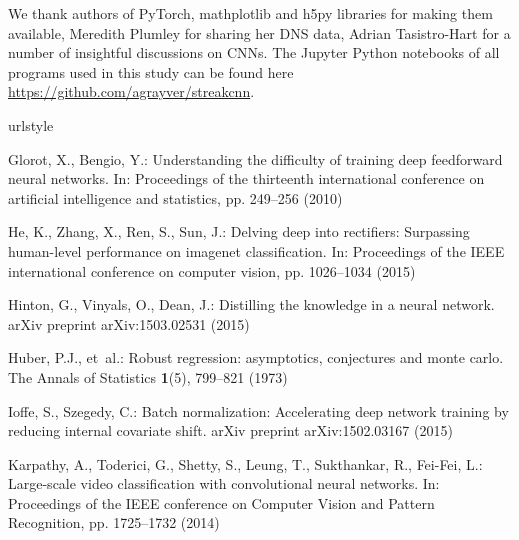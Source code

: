 \documentclass{svjour3}                     %
\begin{document}
\begin{acknowledgements}
We thank authors of PyTorch, mathplotlib and h5py libraries for making them available, Meredith Plumley for sharing her DNS data, Adrian Tasistro-Hart for a number of insightful discussions on CNNs. The Jupyter Python notebooks of all programs used in this study can be found here \url{https://github.com/agrayver/streakcnn}.
\end{acknowledgements}

%

\begin{thebibliography}{17}
\providecommand{\url}[1]{{#1}}
\providecommand{\urlprefix}{URL }
\expandafter\ifx\csname urlstyle\endcsname\relax
  \providecommand{\doi}[1]{DOI~\discretionary{}{}{}#1}\else
  \providecommand{\doi}{DOI~\discretionary{}{}{}\begingroup
  \urlstyle{rm}\Url}\fi

Glorot, X., Bengio, Y.: Understanding the difficulty of training deep
  feedforward neural networks.
\newblock In: Proceedings of the thirteenth international conference on
  artificial intelligence and statistics, pp. 249--256 (2010)

He, K., Zhang, X., Ren, S., Sun, J.: Delving deep into rectifiers: Surpassing
  human-level performance on imagenet classification.
\newblock In: Proceedings of the IEEE international conference on computer
  vision, pp. 1026--1034 (2015)

Hinton, G., Vinyals, O., Dean, J.: Distilling the knowledge in a neural
  network.
\newblock arXiv preprint arXiv:1503.02531  (2015)

Huber, P.J., et~al.: Robust regression: asymptotics, conjectures and monte
  carlo.
\newblock The Annals of Statistics \textbf{1}(5), 799--821 (1973)

Ioffe, S., Szegedy, C.: Batch normalization: Accelerating deep network training
  by reducing internal covariate shift.
\newblock arXiv preprint arXiv:1502.03167  (2015)

Karpathy, A., Toderici, G., Shetty, S., Leung, T., Sukthankar, R., Fei-Fei, L.:
  Large-scale video classification with convolutional neural networks.
\newblock In: Proceedings of the IEEE conference on Computer Vision and Pattern
  Recognition, pp. 1725--1732 (2014)


\end{thebibliography}
\end{document}
